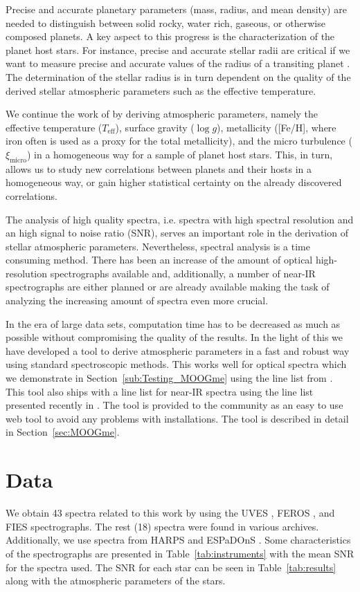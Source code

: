 \documentclass{aa}
\begin{document}
Precise and accurate planetary parameters (mass, radius, and mean density) are
needed to distinguish between solid rocky, water rich, gaseous, or otherwise
composed planets. A key aspect to this progress is the characterization of the
planet host stars. For instance, precise and accurate stellar radii are critical
if we want to measure precise and accurate values of the radius of a transiting
planet \citep[see e.g.][]{Torres2012,Mortier2013}. The determination of the
stellar radius is in turn dependent on the quality of the derived stellar
atmospheric parameters such as the effective temperature.

We continue the work of \citet{Santos13} by deriving atmospheric parameters,
namely the effective temperature ($T_\mathrm{eff}$), surface gravity ($\log g$),
metallicity ([Fe/H], where iron often is used as a proxy for the total
metallicity), and the micro turbulence ($\xi_\mathrm{micro}$) in a homogeneous
way for a sample of planet host stars. This, in turn, allows us to study new
correlations between planets and their hosts in a homogeneous way,  or gain
higher statistical certainty on the already discovered correlations.

The analysis of high quality spectra, i.e. spectra with high spectral resolution
and an high  signal to noise ratio (SNR), serves an important role in the
derivation of stellar atmospheric parameters. Nevertheless, spectral analysis is
a time consuming method. There has been an increase of the amount of  optical
high-resolution spectrographs available and, additionally, a number of near-IR
spectrographs are either planned or are already available making the task of
analyzing the increasing amount of spectra even more crucial.

In the era of large data sets, computation time has to be decreased as much as
possible without compromising the quality of the results. In the light of this
we have developed a tool to derive atmospheric parameters in a fast and robust
way using standard spectroscopic methods. This works well for optical spectra
which we demonstrate in Section~\ref{sub:Testing_MOOGme} using the line list
from \citet{Sousa2011}. This tool also ships with a line list for near-IR
spectra using the line list presented recently in \citet{Andreasen2016}. The
tool is provided to the community as an easy to use web tool to avoid any
problems with installations. The tool is described in detail in
Section~\ref{sec:MOOGme}.



\section{Data}
\label{sec:data}
We obtain 43 spectra related to this work by using the UVES \citep{UVES}, FEROS
\citep{FEROS}, and FIES \citep{FIES} spectrographs. The rest (18) spectra were
found in various archives. Additionally, we use spectra from HARPS \citep{HARPS}
and ESPaDOnS \citep{ESPADONS}. Some characteristics of the spectrographs are
presented in Table~\ref{tab:instruments} with the mean SNR for the spectra used.
The SNR for each star can be seen in Table~\ref{tab:results} along with the
atmospheric parameters of the stars.
\end{document}

